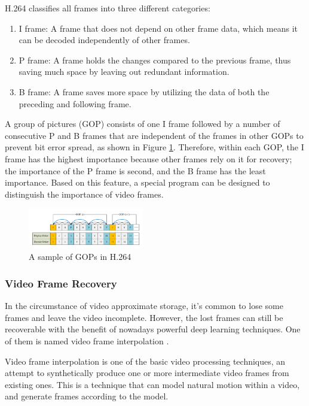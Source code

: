 \documentclass[sigconf]{acmart}
\begin{document}
H.264 classifies all frames into three different categories:
\begin{enumerate}
    \item I frame: A frame that does not depend on other frame data, which means it can be decoded independently of other frames.
    \item P frame: A frame holds the changes compared to the previous frame, thus saving much space by leaving out redundant information.
    \item B frame: A frame saves more space by utilizing the data of both the preceding and following frame.
\end{enumerate}
A group of pictures (GOP) consists of one I frame followed by a number of consecutive P and B frames that are independent of the frames in other GOPs to prevent bit error spread, as shown in Figure \ref{H264-IPB}.
Therefore, within each GOP, the I frame has the highest importance because other frames rely on it for recovery; the importance of the P frame is second, and the B frame has the least importance. Based on this feature, a special program can be designed to distinguish the importance of video frames.

\begin{figure}[ht]
\centering
\includegraphics[width=0.45\textwidth]{photo/H264_IPB.pdf}
\caption{A sample of GOPs in H.264}
\label{H264-IPB}
\end{figure}

\subsubsection{Video Frame Recovery}
In the circumstance of video approximate storage, it's common to lose some frames and leave the video incomplete. However, the lost frames can still be recoverable with the benefit of nowadays powerful deep learning techniques. One of them is named video frame interpolation \cite{meyer2015phase, niklaus2018context}.

Video frame interpolation is one of the basic video processing techniques, an attempt to synthetically produce one or more intermediate video frames from existing ones. This is a technique that can model natural motion within a video, and generate frames according to the model.
\end{document}
